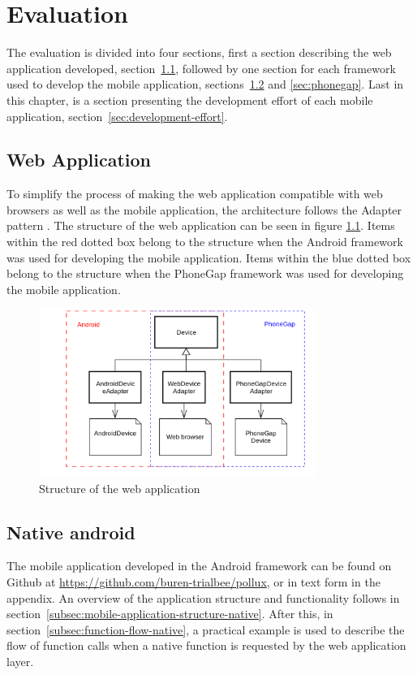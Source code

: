 \chapter{Evaluation}	\label{ch:evaluation}
The evaluation is divided into four sections, first a section describing the web application developed, section~\ref{sec:web-application}, followed by one section for each framework used to develop the mobile application, sections~\ref{sec:native-android} and \ref{sec:phonegap}. Last in this chapter, is a section presenting the development effort of each mobile application, section~\ref{sec:development-effort}.

\section{Web Application}\label{sec:web-application}
To simplify the process of making the web application compatible with web browsers as well as the mobile application, the architecture follows the Adapter pattern \cite[p.~317]{martin2003}. The structure of the web application can be seen in figure \ref{fig:webuml}. Items within the red dotted box belong to the structure when the Android framework was used for developing the mobile application. Items within the blue dotted box belong to the structure when the PhoneGap framework was used for developing the mobile application.

\begin{figure}[h!]
	\centering
    \includegraphics[width=90mm,natwidth=600,natheight=450]{./img/webuml.png}
    \caption{Structure of the web application}
	\label{fig:webuml}
\end{figure}

\section{Native android} \label{sec:native-android}
The mobile application developed in the Android framework can be found on Github at \url{https://github.com/buren-trialbee/pollux}, or in text form in the appendix. An overview of the application structure and functionality follows in section~\ref{subsec:mobile-application-structure-native}. After this, in section~\ref{subsec:function-flow-native}, a practical example is used to describe the flow of function calls when a native function is requested by the web application layer.


